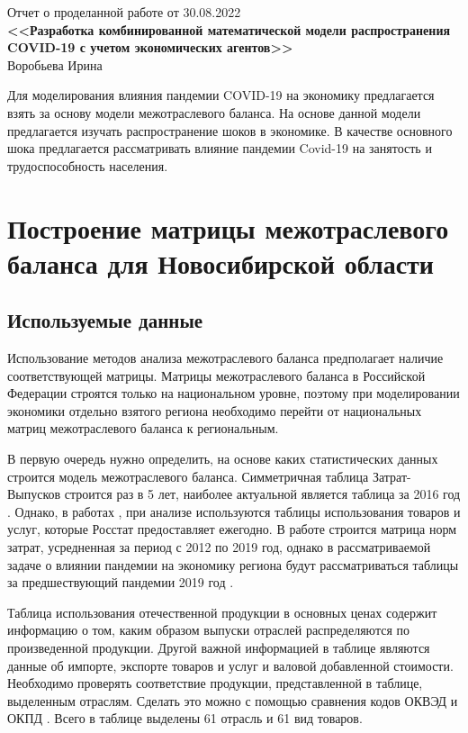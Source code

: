 \documentclass[12pt, a4paper]{article}
\begin{document}
\begin{center}
Отчет о проделанной работе от 30.08.2022\\

\textbf{<<Разработка комбинированной математической модели распространения COVID-19 с учетом экономических агентов>>}\\
Воробьева Ирина
\end{center}

Для моделирования влияния пандемии COVID-19 на экономику предлагается взять за основу модели межотраслевого баланса. На основе данной модели предлагается изучать распространение шоков в экономике. В качестве основного шока предлагается рассматривать влияние пандемии Covid-19 на занятость и трудоспособность населения.

\section{Построение матрицы межотраслевого баланса для Новосибирской области}
\subsection{Используемые данные}
Использование методов анализа межотраслевого баланса предполагает наличие соответствующей матрицы. Матрицы межотраслевого баланса в Российской Федерации строятся только на национальном уровне, поэтому при моделировании экономики отдельно взятого региона необходимо перейти от национальных матриц межотраслевого баланса к региональным.

В первую очередь нужно определить, на основе каких статистических данных строится модель межотраслевого баланса. Симметричная таблица Затрат-Выпусков строится раз в 5 лет, наиболее актуальной является таблица за 2016 год \cite{RosstatZV}. Однако, в работах \cite{AkimovaCourse}, \cite{PonomEvdok} при анализе используются таблицы использования товаров и услуг, которые Росстат предоставляет ежегодно. В работе \cite{AkimovaCourse} строится матрица норм затрат, усредненная за период с 2012 по 2019 год, однако в рассматриваемой задаче о влиянии пандемии на экономику региона будут рассматриваться таблицы за предшествующий пандемии 2019 год  \cite{RosstatTRI}.

Таблица использования отечественной продукции в основных ценах содержит информацию о том, каким образом выпуски отраслей распределяются по произведенной продукции. Другой важной информацией в таблице являются данные об импорте, экспорте товаров и услуг и валовой добавленной стоимости. Необходимо проверять соответствие продукции, представленной в таблице, выделенным отраслям. Сделать это можно с помощью сравнения кодов ОКВЭД и ОКПД \cite{OKPD}.
 Всего в таблице выделены 61 отрасль и 61 вид товаров.
\end{document}
